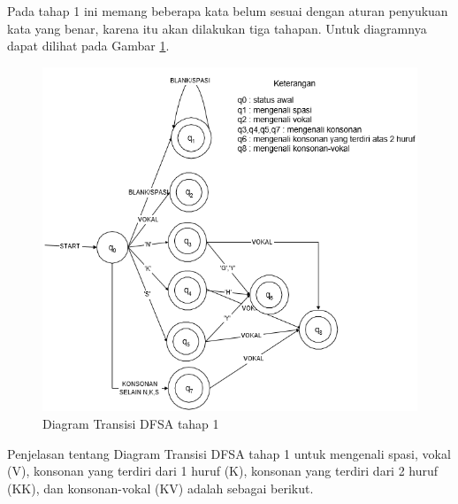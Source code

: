 Pada tahap 1 ini memang beberapa kata belum sesuai dengan aturan penyukuan kata yang benar, karena itu akan dilakukan tiga tahapan. Untuk diagramnya dapat dilihat pada Gambar \ref{fig:1-DFSA-1}.


\begin{figure}[H]
	\centering
	\includegraphics[scale=0.8]{Gambar/DFSA-1}
	\caption{Diagram Transisi DFSA tahap 1\cite{Thomas:2000}} 
	\label{fig:1-DFSA-1}
\end{figure}

Penjelasan tentang Diagram Transisi DFSA tahap 1 untuk mengenali spasi, vokal (V), konsonan yang terdiri dari 1 huruf (K), konsonan yang terdiri dari 2 huruf (KK), dan konsonan-vokal (KV) adalah sebagai berikut.

